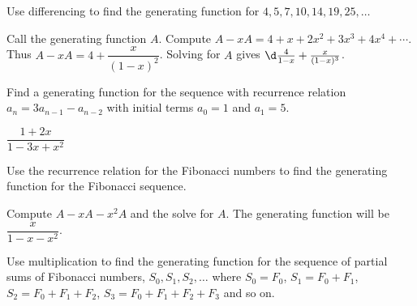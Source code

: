 \begin{questions}
\begin{answer}
	\end{answer}
	
	
	
	


\question Use differencing to find the generating function for $4, 5, 7, 10, 14, 19, 25, \ldots$

	\begin{answer}
		Call the generating function $A$.  Compute $A - xA = 4 + x + 2x^2 + 3x^3 + 4x^4 + \cdots$.  Thus $A - xA = 4 + \dfrac{x}{(1-x)^2}$.  Solving for $A$ gives $\d\frac{4}{1-x} + \frac{x}{(1-x)^3}$.  %
	\end{answer}
	
	
	
	


\question Find a generating function for the sequence with recurrence relation $a_n = 3a_{n-1} - a_{n-2}$ with initial terms $a_0 = 1$ and $a_1 = 5$.

	\begin{answer}
		$\dfrac{1+2x}{1-3x + x^2}$  %
	\end{answer}
	
	
	
	


\question Use the recurrence relation for the Fibonacci numbers to find the generating function for the Fibonacci sequence.

	\begin{answer}
		Compute $A - xA - x^2A$ and the solve for $A$.  The generating function will be $\dfrac{x}{1-x-x^2}$.  %
	\end{answer}
	
	
	
	


\question Use multiplication to find the generating function for the sequence of partial sums of Fibonacci numbers, $S_0, S_1, S_2, \ldots$ where $S_0 = F_0$, $S_1 = F_0 + F_1$, $S_2 = F_0 + F_1 + F_2$, $S_3 = F_0 + F_1 + F_2 + F_3$ and so on.


\end{questions}
